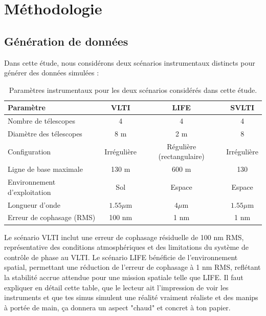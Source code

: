 \documentclass{article}
\newcommand{\dm}[1]{{\color{mulberry} #1}}
\begin{document}
\section{Méthodologie}



\subsection{Génération de données}

Dans cette étude, nous considérons deux scénarios instrumentaux distincts pour générer des données simulées :

\begin{table}[H]
\centering
\begin{tabular}{|l|c|c|c|}
\hline
\textbf{Paramètre} & \textbf{VLTI} & \textbf{LIFE} & \textbf{SVLTI} \\
\hline
Nombre de télescopes & 4 & 4 & 4 \\
Diamètre des télescopes & 8 m & 2 m & 8 \\
Configuration & Irrégulière & Régulière (rectangulaire) & Irrégulière \\
Ligne de base maximale & 130 m & 600 m & 130 \\
Environnement d'exploitation & Sol & Espace & Espace \\
Longueur d'onde & $1.55\mu$m & $4\mu$m & $1.55\mu$m \\
Erreur de cophasage (RMS) & 100 nm & 1 nm & 1 nm \\
\hline
\end{tabular}
\caption{Paramètres instrumentaux pour les deux scénarios considérés dans cette étude.}
\label{tab:scenarios}
\end{table}

Le scénario VLTI inclut une erreur de cophasage résiduelle de 100 nm RMS, représentative des conditions atmosphériques et des limitations du système de contrôle de phase au VLTI. Le scénario LIFE bénéficie de l'environnement spatial, permettant une réduction de l'erreur de cophasage à 1 nm RMS, reflétant la stabilité accrue attendue pour une mission spatiale telle que LIFE.\dm{Il faut expliquer en détail cette table, que le lecteur ait l'impression de voir les instruments et que tes simus simulent une réalité vraiment réaliste et des manips à portée de main, ça donnera un aspect "chaud" et concret à ton papier.}
\end{document}
